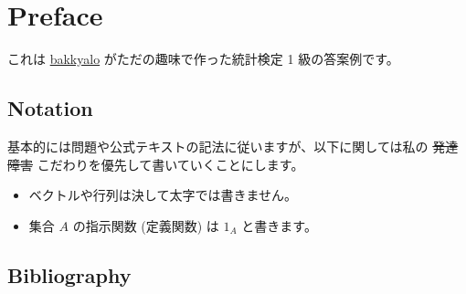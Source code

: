 \documentclass[./main.tex]{subfiles}
\begin{document}
    \section*{Preface}

    これは \href{https://github.com/bakkyalo}{bakkyalo} がただの趣味で作った統計検定 1 級の答案例です。

    \subsection*{Notation}

    基本的には問題や公式テキストの記法に従いますが、以下に関しては私の \sout{発達障害} こだわりを優先して書いていくことにします。
    \begin{itemize}
        \item ベクトルや行列は決して太字では書きません。
        \item 集合 $A$ の指示関数 (定義関数) は $1_A$ と書きます。
    \end{itemize}


    \renewcommand{\refname}{}

    \subsection*{Bibliography}
    \printbibliography[heading=none]
    \nocite{*}
\end{document}
